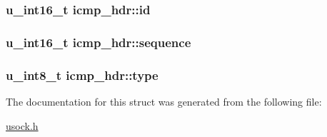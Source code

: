 \hypertarget{structicmp__hdr_8ceada44796f077ba4398312b65aa6e5}{
\subsubsection[{id}]{\setlength{\rightskip}{0pt plus 5cm}u\_\-int16\_\-t {\bf icmp\_\-hdr::id}}}
\label{structicmp__hdr_8ceada44796f077ba4398312b65aa6e5}


\hypertarget{structicmp__hdr_747445ef1c8275eccce121fd1a5f5b90}{
\subsubsection[{sequence}]{\setlength{\rightskip}{0pt plus 5cm}u\_\-int16\_\-t {\bf icmp\_\-hdr::sequence}}}
\label{structicmp__hdr_747445ef1c8275eccce121fd1a5f5b90}


\hypertarget{structicmp__hdr_054d3b022febf3b05f1ddb9dd906dbfa}{
\subsubsection[{type}]{\setlength{\rightskip}{0pt plus 5cm}u\_\-int8\_\-t {\bf icmp\_\-hdr::type}}}
\label{structicmp__hdr_054d3b022febf3b05f1ddb9dd906dbfa}




The documentation for this struct was generated from the following file:\begin{CompactItemize}
\item 
\hyperlink{usock_8h}{usock.h}\end{CompactItemize}
